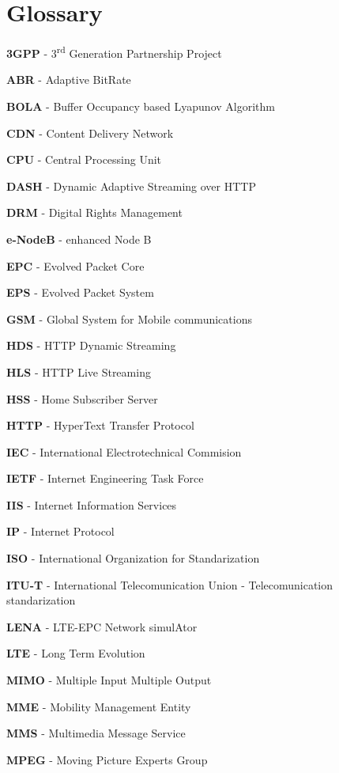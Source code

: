 \cleardoublepage
{}
\chapter*{Glossary}


\textbf{3GPP} - 3\textsuperscript{rd} Generation Partnership Project

\textbf{ABR} - Adaptive BitRate

\textbf{BOLA} - Buffer Occupancy based Lyapunov Algorithm

\textbf{CDN} - Content Delivery Network

\textbf{CPU} - Central Processing Unit

\textbf{DASH} - Dynamic Adaptive Streaming over HTTP

\textbf{DRM} - Digital Rights Management

\textbf{e-NodeB} - enhanced Node B

\textbf{EPC} - Evolved Packet Core

\textbf{EPS} - Evolved Packet System

\textbf{GSM} - Global System for Mobile communications

\textbf{HDS} - HTTP Dynamic Streaming

\textbf{HLS} - HTTP Live Streaming

\textbf{HSS} - Home Subscriber Server

\textbf{HTTP} - HyperText Transfer Protocol

\textbf{IEC} - International Electrotechnical Commision

\textbf{IETF} - Internet Engineering Task Force

\textbf{IIS} - Internet Information Services

\textbf{IP} - Internet Protocol

\textbf{ISO} - International Organization for Standarization

\textbf{ITU-T} - International Telecomunication Union - Telecomunication standarization

\textbf{LENA} - LTE-EPC Network simulAtor

\textbf{LTE} - Long Term Evolution

\textbf{MIMO} - Multiple Input Multiple Output

\textbf{MME} - Mobility Management Entity

\textbf{MMS} - Multimedia Message Service

\textbf{MPEG} - Moving Picture Experts Group

